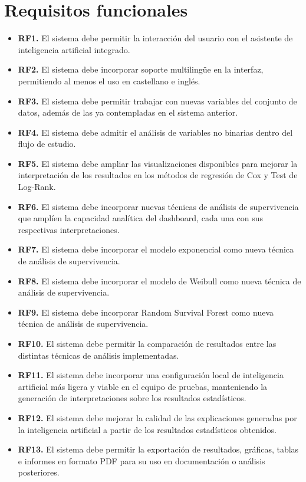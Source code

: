 \section{Requisitos funcionales}
\begin{itemize}
    \item \textbf{RF1.} El sistema debe permitir la interacción del usuario con el asistente de inteligencia artificial integrado.
    
    \item \textbf{RF2.} El sistema debe incorporar soporte multilingüe en la interfaz, permitiendo al menos el uso en castellano e inglés.
    
    \item \textbf{RF3.} El sistema debe permitir trabajar con nuevas variables del conjunto de datos, además de las ya contempladas en el sistema anterior.
    
    \item \textbf{RF4.} El sistema debe admitir el análisis de variables no binarias dentro del flujo de estudio.
    
    \item \textbf{RF5.} El sistema debe ampliar las visualizaciones disponibles para mejorar la interpretación de los resultados en los métodos de regresión de Cox y Test de Log-Rank.
    
    \item \textbf{RF6.} El sistema debe incorporar nuevas técnicas de análisis de supervivencia que amplíen la capacidad analítica del dashboard, cada una con sus respectivas interpretaciones.
    
    \item \textbf{RF7.} El sistema debe incorporar el modelo exponencial como nueva técnica de análisis de supervivencia.
    
    \item \textbf{RF8.} El sistema debe incorporar el modelo de Weibull como nueva técnica de análisis de supervivencia.
    
    \item \textbf{RF9.} El sistema debe incorporar Random Survival Forest como nueva técnica de análisis de supervivencia.
    
    \item \textbf{RF10.} El sistema debe permitir la comparación de resultados entre las distintas técnicas de análisis implementadas.
    
    \item \textbf{RF11.} El sistema debe incorporar una configuración local de inteligencia artificial más ligera y viable en el equipo de pruebas, manteniendo la generación de interpretaciones sobre los resultados estadísticos.
    
    \item \textbf{RF12.} El sistema debe mejorar la calidad de las explicaciones generadas por la inteligencia artificial a partir de los resultados estadísticos obtenidos.
    
    \item \textbf{RF13.} El sistema debe permitir la exportación de resultados, gráficas, tablas e informes en formato PDF para su uso en documentación o análisis posteriores.
\end{itemize}
